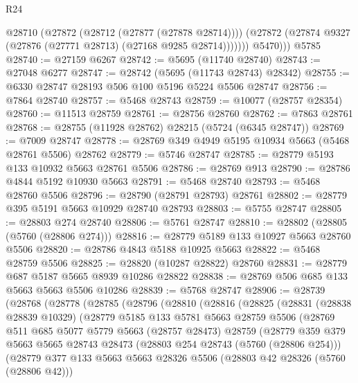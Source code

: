 \begin{lexlean}{R24}
\begin{coremodule}
            @28710
              (@27872 (@28712 (@27877 (@27878 @28714))))
              (@27872 (@27874 @9327 (@27876 (@27771 @28713) (@27168 @9285 @28714)))))))
          @5470)))
    @5785
@28740 := @27159 @6267
@28742 := @5695 (@11740 @28740)
@28743 := @27048 @6277
@28747 := @28742 (@5695 (@11743 @28743) @28342)
@28755 := @6330 @28747 @28193 @506 @100 @5196 @5224 @5506 @28747
@28756 := @7864 @28740
@28757 := @5468 @28743
@28759 := @10077 (@28757 @28354)
@28760 := @11513 @28759
@28761 := @28756 @28760
@28762 := @7863 @28761
@28768 := @28755 (@11928 @28762) @28215 (@5724 (@6345 @28747))
@28769 := @7009 @28747
@28778 := @28769 @349 @4949 @5195 @10934 @5663 (@5468 @28761 @5506) @28762
@28779 := @5746 @28747
@28785 := @28779 @5193 @133 @10932 @5663 @28761 @5506
@28786 := @28769 @913
@28790 := @28786 @4844 @5192 @10930 @5663
@28791 := @5468 @28740
@28793 := @5468 @28760 @5506
@28796 := @28790 (@28791 @28793) @28761
@28802 := @28779 @395 @5191 @5663 @10929 @28740 @28793
@28803 := @5755 @28747
@28805 := @28803 @274 @28740
@28806 := @5761 @28747
@28810 := @28802 (@28805 (@5760 (@28806 @274)))
@28816 := @28779 @5189 @133 @10927 @5663 @28760 @5506
@28820 := @28786 @4843 @5188 @10925 @5663
@28822 := @5468 @28759 @5506
@28825 := @28820 (@10287 @28822) @28760
@28831 := @28779 @687 @5187 @5665 @8939 @10286 @28822
@28838 := @28769 @506 @685 @133 @5663 @5663 @5506 @10286
@28839 := @5768 @28747
@28906 := @28739
    (@28768
      (@28778
        (@28785
          (@28796
            (@28810
              (@28816
                (@28825
                  (@28831
                    (@28838 @28839 @10329)
                    (@28779
                      @5185
                      @133
                      @5781
                      @5663
                      @28759
                      @5506
                      (@28769
                        @511
                        @685
                        @5077
                        @5779
                        @5663
                        (@28757 @28473)
                        @28759
                        (@28779
                          @359
                          @379
                          @5663
                          @5665
                          @28743
                          @28473
                          (@28803 @254 @28743 (@5760 (@28806 @254)))
                          (@28779
                            @377
                            @133
                            @5663
                            @5663
                            @28326
                            @5506
                            (@28803 @42 @28326 (@5760 (@28806 @42)))

\end{coremodule}
\end{lexlean}
